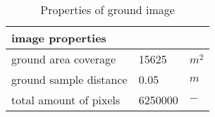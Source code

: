\begin{table}[H]
\centering
\caption{Properties of ground image}
\label{tab:image_properties}
\begin{tabular}{|l|ll|}\hline
\textbf{image properties}       &         &                     \\ \hline
ground area coverage   & 15625   & $m^2$ \\
ground sample distance & 0.05    & $m$                   \\
total amount of pixels & 6250000 & $-$ \\ \hline                   
\end{tabular}
\end{table}